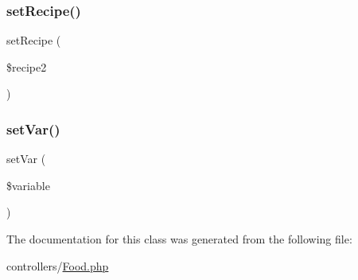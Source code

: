 \subsubsection{\texorpdfstring{set\+Recipe()}{setRecipe()}}
{\footnotesize\ttfamily set\+Recipe (\begin{DoxyParamCaption}\item[{}]{\$recipe2 }\end{DoxyParamCaption})}

\mbox{\label{class_food_a7a4815360caa28b9dd57e867b8c24134}} 
\subsubsection{\texorpdfstring{set\+Var()}{setVar()}}
{\footnotesize\ttfamily set\+Var (\begin{DoxyParamCaption}\item[{}]{\$variable }\end{DoxyParamCaption})}



The documentation for this class was generated from the following file\+:\begin{DoxyCompactItemize}
\item 
controllers/\mbox{\hyperlink{_food_8php}{Food.\+php}}\end{DoxyCompactItemize}
